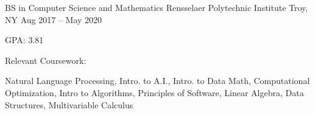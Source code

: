 


\begin{cventries}

  \cventry
  {BS in Computer Science and Mathematics}
  {Rensselaer Polytechnic Institute}
  {Troy, NY}
  {Aug 2017 – May 2020}
  {
    \begin{cvitems}
      \item GPA: 3.81
      \item Relevant Coursework:
      \vspace*{1.15\abovedisplayskip}
      \begin{cvitems}
        \item Natural Language Processing, Intro. to A.I., Intro. to Data Math, Computational Optimization,  Intro to Algorithms, Principles of Software, Linear Algebra, Data Structures, Multivariable Calculus
      \end{cvitems}
    \end{cvitems}
  }


\end{cventries}